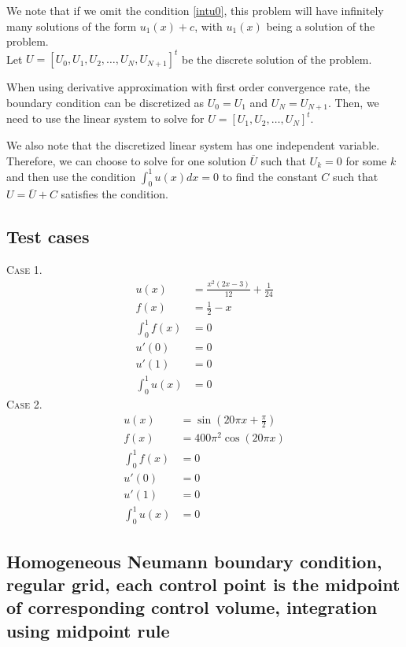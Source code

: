 \documentclass[a4paper]{article}
\numberwithin{equation}{section}
\begin{document}
	We note that if we omit the condition \eqref{intu0}, this problem will have infinitely many solutions of the form $u_1(x)+c$, with $u_1(x)$ being a solution of the problem.\\
	Let $U=\left[U_0, U_1, U_2, \dots,U_N, U_{N+1}\right]^t$ be the discrete solution of the problem.
	
When using derivative approximation with first order convergence rate, the boundary condition can be discretized as $U_0=U_1$ and $U_N=U_{N+1}$. Then, we need to use the linear system to solve for $U=\left[U_1, U_2, \dots,U_N\right]^t$.

We also note that the discretized linear system has one independent variable. Therefore, we can choose to solve for one solution $\overline{U}$ such that $U_k=0$ for some $k$ and then use the condition $\int_{0}^{1}u(x)dx=0$ to find the constant $C$ such that $U=\overline{U}+C$ satisfies the condition.\\

\subsection{Test cases}
\textsc{Case 1.}
\begin{align}
u(x)&=\frac{x^2\left(2x-3\right)}{12}+\frac{1}{24}\\
	f(x)&=\frac{1}{2}-x\\
\int_{0}^{1}f(x)&=0\\
	u'(0)&=0\\
	u'(1)&=0\\
	\int_{0}^{1}u(x)&=0
\end{align}
\noindent
\textsc{Case 2.}
\begin{align}
u(x)&=\sin\left(20\pi x +\frac{\pi}{2}\right)\\
	f(x)&=400\pi^2\cos\left(20\pi x\right)\\
\int_{0}^{1}f(x)&=0\\
	u'(0)&=0\\
	u'(1)&=0\\
	\int_{0}^{1}u(x)&=0
\end{align}
\subsection{Homogeneous Neumann boundary condition, regular grid, each control point is the midpoint of corresponding control volume, integration using midpoint rule}
\end{document}
